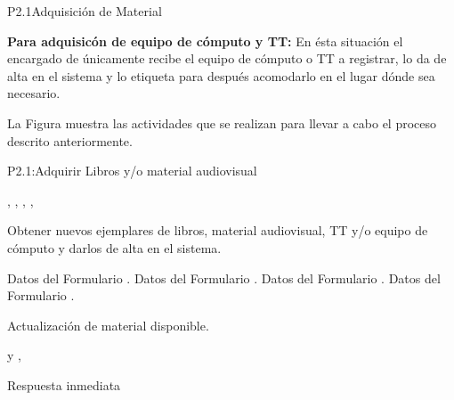 \begin{Proceso}{P2.1}{Adquisición de Material}
{\textbf{Para adquisicón de equipo de cómputo y TT:} En ésta situación el encargado de  únicamente recibe el equipo de cómputo o TT a registrar, lo da de alta en el sistema y lo etiqueta para después acomodarlo en el lugar dónde sea necesario.

  
  \newpage
  \noindent La Figura  muestra las actividades que se realizan para llevar a cabo el proceso descrito anteriormente.


} {P2.1:Adquirir Libros y/o material audiovisual}

   { %
	,
	 ,
	,
	,
  }

   { %
    Obtener nuevos ejemplares de libros, material audiovisual, TT y/o equipo de cómputo y darlos de alta en el sistema.
  }

   { %
  	\begin{UClist}
  		\UCli Datos del Formulario . 
  		\UCli Datos del Formulario .
		\UCli Datos del Formulario .
		\UCli Datos del Formulario . 
     	
    \end {UClist}
  }
  
   { %
  }

   { %
    \begin{UClist}
		\UCli	Actualización de material disponible.
    \end{UClist}
  }

   { %
     y
	,
  }

   { %
    \begin{UClist}
      \UCli Respuesta inmediata
    \end{UClist}
  }
   { %
  }


\end{Proceso}

